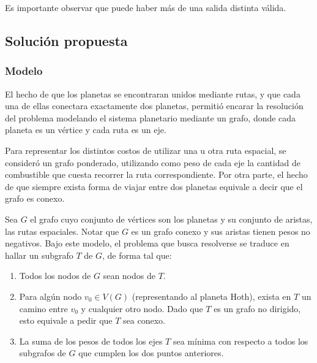     Es importante observar que puede haber más de una salida distinta válida.

    \subsection{Solución propuesta}

    \subsubsection{Modelo}

    El hecho de que los planetas se encontraran unidos mediante rutas, y que
    cada una de ellas conectara exactamente dos planetas, permitió encarar la
    resolución del problema modelando el sistema planetario mediante un
    grafo, donde cada planeta es un vértice y cada ruta es un eje.

    Para representar los distintos costos de utilizar una u otra ruta
    espacial, se consideró un grafo ponderado, utilizando como peso de cada
    eje la cantidad de combustible que cuesta recorrer la ruta
    correspondiente. Por otra parte, el hecho de que siempre exista forma de
    viajar entre dos planetas equivale a decir que el grafo es conexo.

    Sea $G$ el grafo cuyo conjunto de vértices son los planetas y su conjunto
    de aristas, las rutas espaciales. Notar que $G$ es un grafo conexo y
    sus aristas tienen pesos no negativos. Bajo este modelo, el problema que
    busca resolverse se traduce en hallar un subgrafo $T$ de $G$, de forma tal
    que:
    \begin{enumerate}
        \item Todos los nodos de $G$ sean nodos de $T$.
        \item Para algún nodo $v_0 \in V(G)$ (representando al planeta Hoth),
        exista en $T$ un camino entre $v_0$ y cualquier otro nodo. Dado que
        $T$ es un grafo no dirigido, esto equivale a pedir que $T$ sea conexo.
        \item La suma de los pesos de todos los ejes $T$ sea mínima con
        respecto a todos los subgrafos de $G$ que cumplen los dos puntos
        anteriores.
    \end{enumerate}

